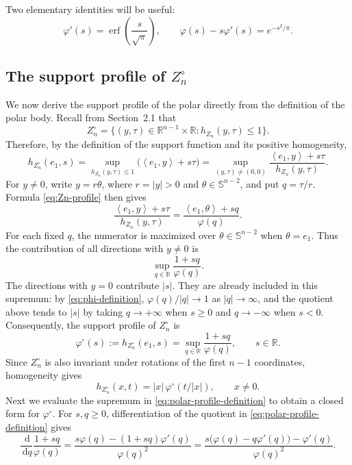 \documentclass[11pt]{article}
\theoremstyle{definition}
\theoremstyle{remark}
\newcommand{\R}{\mathbb R}
\newcommand{\Sph}{\mathbb S}
\newcommand{\dd}{\,\mathrm d}
\newcommand{\abs}[1]{\left|#1\right|}
\newcommand{\ip}[2]{\left\langle #1,#2\right\rangle}
\newcommand{\erf}{\operatorname{erf}}
\begin{document}
Two elementary identities will be useful:
\begin{equation}\label{eq:phi-identities}
 \varphi'(s)=\erf\!\left(\frac{s}{\sqrt\pi}\right),
 \qquad
 \varphi(s)-s\varphi'(s)=e^{-s^2/\pi}.
\end{equation}
\subsection{The support profile of \texorpdfstring{$Z_n^\circ$}{Z\_n polar}}
We now derive the support profile of the polar directly from the
definition of the polar body.  Recall from Section~2.1 that
\[
 Z_n^\circ
 =\bigl\{(y,\tau)\in\R^{n-1}\times\R:
          h_{Z_n}(y,\tau)\leq1\bigr\}.
\]
Therefore, by the definition of the support function and its positive
homogeneity,
$$
 h_{Z_n^\circ}(e_1,s)=\sup_{h_{Z_n}(y,\tau)\leq1}
       \bigl(\ip{e_1}{y}+s\tau\bigr)=\sup_{(y,\tau)\neq(0,0)}
       \frac{\ip{e_1}{y}+s\tau}{h_{Z_n}(y,\tau)}.
$$
For $y\neq0$, write $y=r\theta$, where $r=\abs{y}>0$ and
$\theta\in\Sph^{n-2}$, and put $q=\tau/r$.  Formula
\eqref{eq:Zn-profile} then gives
\[
 \frac{\ip{e_1}{y}+s\tau}{h_{Z_n}(y,\tau)}
 =\frac{\ip{e_1}{\theta}+sq}{\varphi(q)}.
\]
For each fixed $q$, the numerator is maximized over
$\theta\in\Sph^{n-2}$ when $\theta=e_1$.  Thus the contribution of
all directions with $y\neq0$ is
\[
 \sup_{q\in\R}\frac{1+sq}{\varphi(q)}.
\]
The directions with $y=0$ contribute $\abs{s}$.  They are already
included in this supremum: by \eqref{eq:phi-definition},
$\varphi(q)/\abs q\to1$ as $\abs q\to\infty$, and the quotient above
tends to $\abs{s}$ by taking $q\to+\infty$ when $s\geq0$ and
$q\to-\infty$ when $s<0$.  Consequently, the support profile of
$Z_n^\circ$ is
\begin{equation}\label{eq:polar-profile-definition}
 \varphi^\circ(s)
 :=h_{Z_n^\circ}(e_1,s)
 =\sup_{q\in\R}\frac{1+sq}{\varphi(q)},
 \qquad s\in\R.
\end{equation}
Since $Z_n^\circ$ is also invariant under rotations of the first
$n-1$ coordinates, homogeneity gives
\begin{equation}\label{eq:polar-support-profile}
 h_{Z_n^\circ}(x,t)
 =\abs{x}\,\varphi^\circ(t/\abs{x}),
 \qquad x\neq0.
\end{equation}
Next we evaluate the supremum in \eqref{eq:polar-profile-definition} to obtain a closed form for $\varphi^\circ$. For $s,q\geq0$, differentiation of the quotient in
\eqref{eq:polar-profile-definition} gives
$$
 \frac{\dd}{\dd q}\frac{1+sq}{\varphi(q)}
 =\frac{s\varphi(q)-(1+sq)\varphi'(q)}{\varphi(q)^2}=\frac{s\bigl(\varphi(q)-q\varphi'(q)\bigr)
          -\varphi'(q)}{\varphi(q)^2}.
$$
\end{document}
